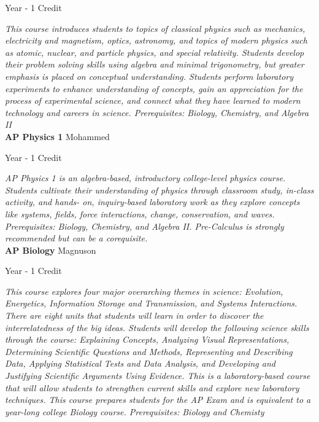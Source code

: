 \noindent Year - 1 Credit

\vspace{1mm}\emph{This course introduces students to topics of classical physics such as mechanics,
electricity and magnetism, optics, astronomy, and topics of modern physics such as atomic, nuclear, and
particle physics, and special relativity. Students develop their problem solving skills using algebra and
minimal trigonometry, but greater emphasis is placed on conceptual understanding. Students perform
laboratory experiments to enhance understanding of concepts, gain an appreciation for the process of
experimental science, and connect what they have learned to modern technology and careers in
science. Prerequisites: Biology, Chemistry, and Algebra II}\\


\noindent\textbf{AP Physics 1} \hfill Mohammed

\noindent Year - 1 Credit

\vspace{1mm}\emph{AP Physics 1 is an algebra-based, introductory college-level physics course.
Students cultivate their understanding of physics through classroom study, in-class activity, and hands-
on, inquiry-based laboratory work as they explore concepts like systems, fields, force interactions,
change, conservation, and waves. Prerequisites: Biology, Chemistry, and Algebra II. Pre-Calculus is strongly recommended but can be a corequisite.}\\


\noindent\textbf{AP Biology} \hfill Magnuson

\noindent Year - 1 Credit

\vspace{1mm}\emph{This course explores four major overarching themes in science: Evolution, Energetics, Information Storage and Transmission, and Systems Interactions. There are eight units that students will learn in order to discover the interrelatedness of the big ideas. Students will develop the following science skills through the course: Explaining Concepts, Analyzing Visual Representations, Determining Scientific Questions and Methods, Representing and Describing Data, Applying Statistical Tests and Data Analysis, and Developing and Justifying Scientific Arguments Using Evidence. This is a laboratory-based course that will allow students to strengthen current skills and explore new laboratory techniques. This course prepares students for the AP Exam and is equivalent to a year-long college Biology course. Prerequisites: Biology and Chemisty}\\


